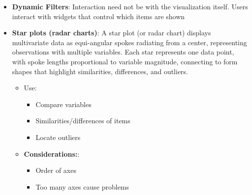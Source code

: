 \documentclass{report}
\begin{document}
\begin{itemize}
            They help because the user can see the distribution of the data before filtering
        \item \textbf{Dynamic Filters}: Interaction need not be with the visualization itself. Users interact with widgets that control which items are shown 
        \item \textbf{Star plots (radar charts)}: A star plot (or radar chart) displays multivariate data as equi-angular spokes radiating from a center, representing observations with multiple variables. Each star represents one data point, with spoke lengths proportional to variable magnitude, connecting to form shapes that highlight similarities, differences, and outliers. 
            \begin{itemize}
                \item Use:
                    \begin{itemize}
                        \item Compare variables
                        \item Similarities/differences of items
                        \item Locate outliers
                    \end{itemize}
                \item \textbf{Considerations:}:
                    \begin{itemize}
                        \item Order of axes
                        \item Too many axes cause problems
                    \end{itemize}
            \end{itemize}

    \end{itemize}

    \pagebreak 
\end{document}
